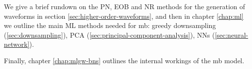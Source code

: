 \documentclass[main.tex]{subfiles}
\begin{document}
We give a brief rundown on the \ac{PN}, \ac{EOB} and \ac{NR} methods for the generation of waveforms in section \ref{sec:higher-order-waveforms}, and then in chapter \ref{chap:ml} we outline the main \ac{ML} methods needed for \ac{mb}: greedy downsampling (\ref{sec:downsampling}), \ac{PCA} (\ref{sec:principal-component-analysis}), \acp{NN} (\ref{sec:neural-network}). 

Finally, chapter \ref{chap:mlgw-bns} outlines the internal workings of the \ac{mb} model. 
\end{document}
